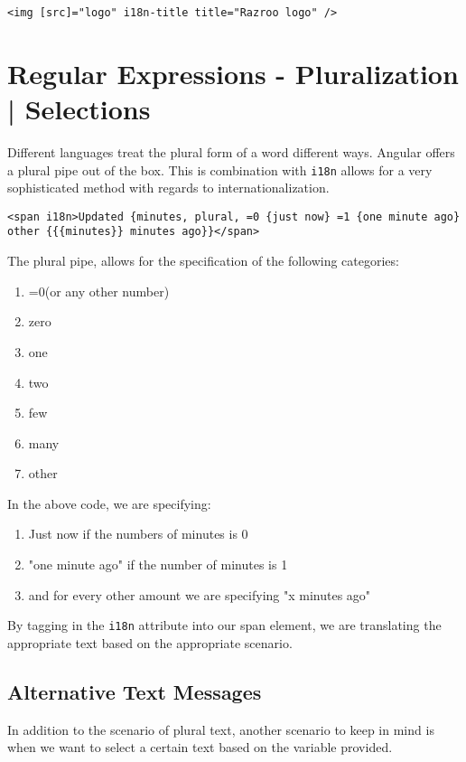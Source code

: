 \begin{lstlisting}
<img [src]="logo" i18n-title title="Razroo logo" />
\end{lstlisting}

\section{ Regular Expressions - Pluralization | Selections }
Different languages treat the plural form of a word different ways. Angular offers a plural pipe out of the box. This is combination with \lstinline{i18n} allows for a very sophisticated method with regards to internationalization. 

\begin{lstlisting}
<span i18n>Updated {minutes, plural, =0 {just now} =1 {one minute ago} other {{{minutes}} minutes ago}}</span>
\end{lstlisting}

The plural pipe, allows for the specification of the following categories: 
\begin{enumerate}
\item =0(or any other number)  
\item zero  
\item one
\item two
\item few
\item many
\item other
\end{enumerate}

In the above code, we are specifying: 
\begin{enumerate}
\item Just now if the numbers of minutes is 0 
\item "one minute ago" if the number of minutes is 1
\item and for every other amount we are specifying "x minutes ago" 
\end{enumerate}

By tagging in the \lstinline{i18n} attribute into our span element, we are translating the appropriate text based on the appropriate scenario. 

\subsection{Alternative Text Messages}
In addition to the scenario of plural text, another scenario to keep in mind is when we want to select a certain text based on the variable provided. 


